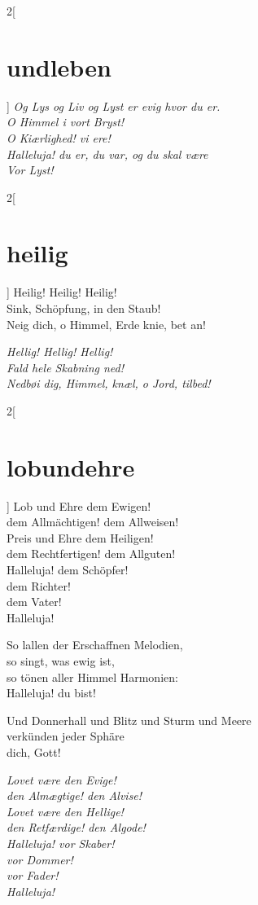 \documentclass[shorttitlesize=45,tocstyle=ref]{ees}
\begin{document}
{\begin{multicols}{2}[\section{undleben}]
\columnbreak\itshape
Og Lys og Liv og Lyst er evig hvor du er.\\
O Himmel i vort Bryst!\\
O Kiærlighed! vi ere!\\
Halleluja! du er, du var, og du skal være\\
Vor Lyst!
\end{multicols}

\begin{multicols}{2}[\section{heilig}]
Heilig! Heilig! Heilig!\\
Sink, Schöpfung, in den Staub!\\
Neig dich, o Himmel, Erde knie, bet an!

\columnbreak\itshape
Hellig! Hellig! Hellig!\\
Fald hele Skabning ned!\\
Nedbøi dig, Himmel, knæl, o Jord, tilbed!
\end{multicols}

\begin{multicols}{2}[\section{lobundehre}]
Lob und Ehre dem Ewigen!\\
\hspace*{1em}dem Allmächtigen! dem Allweisen!\\
Preis und Ehre dem Heiligen!\\
\hspace*{1em}dem Rechtfertigen! dem Allguten!\\
Halleluja! dem Schöpfer!\\
dem Richter!\\
dem Vater!\\
Halleluja!

So lallen der Erschaffnen Melodien,\\
so singt, was ewig ist,\\
so tönen aller Himmel Harmonien:\\
Halleluja! du bist!

Und Donnerhall und Blitz und Sturm und Meere\\
verkünden jeder Sphäre\\
dich, Gott!

\columnbreak\itshape
Lovet være den Evige!\\
\hspace*{1em}den Almægtige! den Alvise!\\
Lovet være den Hellige!\\
\hspace*{1em}den Retfærdige! den Algode!\\
Halleluja! vor Skaber!\\
vor Dommer!\\
vor Fader!\\
Halleluja!


\end{multicols}}
\end{document}
